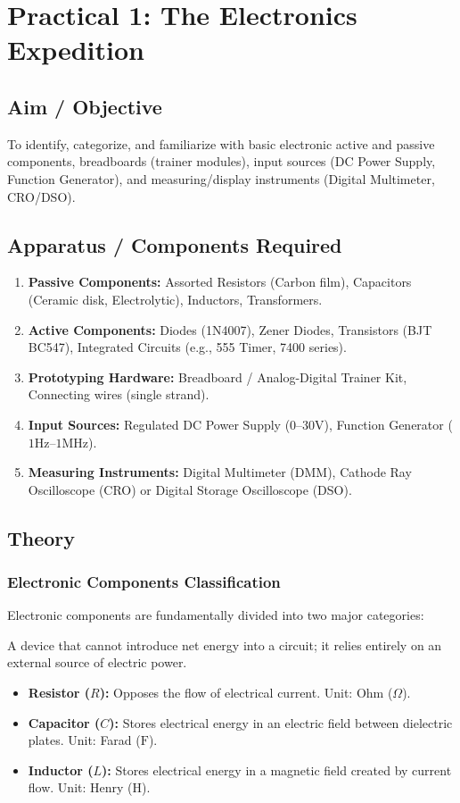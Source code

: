 \chapter{Practical 1: The Electronics Expedition}

\section{Aim / Objective}
To identify, categorize, and familiarize with basic electronic active and passive components, breadboards (trainer modules), input sources (DC Power Supply, Function Generator), and measuring/display instruments (Digital Multimeter, CRO/DSO).

\section{Apparatus / Components Required}
\begin{enumerate}
    \item \textbf{Passive Components:} Assorted Resistors (Carbon film), Capacitors (Ceramic disk, Electrolytic), Inductors, Transformers.
    \item \textbf{Active Components:} Diodes (1N4007), Zener Diodes, Transistors (BJT BC547), Integrated Circuits (e.g., 555 Timer, 7400 series).
    \item \textbf{Prototyping Hardware:} Breadboard / Analog-Digital Trainer Kit, Connecting wires (single strand).
    \item \textbf{Input Sources:} Regulated DC Power Supply ($0\text{--}30\text{V}$), Function Generator ($1\text{Hz}\text{--}1\text{MHz}$).
    \item \textbf{Measuring Instruments:} Digital Multimeter (DMM), Cathode Ray Oscilloscope (CRO) or Digital Storage Oscilloscope (DSO).
\end{enumerate}

\section{Theory}

\subsection{Electronic Components Classification}
Electronic components are fundamentally divided into two major categories:

\begin{definition}
A device that cannot introduce net energy into a circuit; it relies entirely on an external source of electric power.
\begin{itemize}
    \item \textbf{Resistor ($R$):} Opposes the flow of electrical current. Unit: Ohm ($\Omega$).
    \item \textbf{Capacitor ($C$):} Stores electrical energy in an electric field between dielectric plates. Unit: Farad ($\text{F}$).
    \item \textbf{Inductor ($L$):} Stores electrical energy in a magnetic field created by current flow. Unit: Henry ($\text{H}$).
\end{itemize}
\end{definition}

